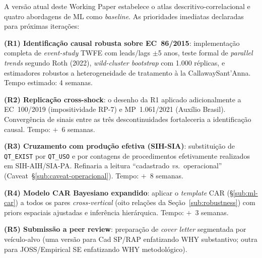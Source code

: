 \documentclass[12pt,a4paper,oneside]{article}
\begin{document}
A versão atual deste Working Paper estabelece o atlas
descritivo-correlacional e quatro abordagens de ML como
\textit{baseline}. As prioridades imediatas declaradas para
próximas iterações:

\textbf{(R1) Identificação causal robusta sobre EC~86/2015}:
implementação completa de \textit{event-study} TWFE com
leads/lags $\pm$5 anos, teste formal de \textit{parallel trends}
segundo Roth (2022), \textit{wild-cluster bootstrap} com 1.000
réplicas, e estimadores robustos a heterogeneidade de tratamento
à la Callaway\textendash Sant'Anna. Tempo estimado: 4
semanas.

\textbf{(R2) Replicação cross-shock}: o desenho da R1 aplicado
adicionalmente a EC~100/2019 (impositividade RP-7) e MP~1.061/2021
(Auxílio Brasil). Convergência de sinais entre as três
descontinuidades fortaleceria a identificação causal. Tempo:
$+$~6 semanas.

\textbf{(R3) Cruzamento com produção efetiva (SIH-SIA)}:
substituição de \texttt{QT\_EXIST} por \texttt{QT\_USO} e por
contagens de procedimentos efetivamente realizados em
SIH-AIH/SIA-PA. Refinaria a leitura ``cadastrado \textit{vs.}\
operacional'' (Caveat~§\ref{sub:caveat-operacional}). Tempo:
$+$~8 semanas.

\textbf{(R4) Modelo CAR Bayesiano expandido}: aplicar o
\textit{template} CAR (§\ref{sub:ml-car}) a todos os pares
\textit{cross-vertical} (oito relações da
Seção~\ref{sub:robustness}) com priors espaciais ajustadas e
inferência hierárquica. Tempo: $+$~3 semanas.

\textbf{(R5) Submissão a peer review}: preparação de \textit{cover
letter} segmentada por veículo-alvo (uma versão para Cad SP/RAP
enfatizando WHY substantivo; outra para JOSS/Empirical SE
enfatizando WHY metodológico).

\end{document}
